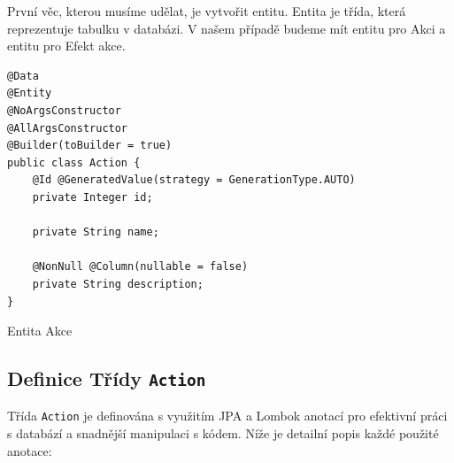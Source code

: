 První věc, kterou musíme udělat, je vytvořit entitu. Entita je třída, která reprezentuje tabulku v databázi. V našem případě budeme mít entitu pro Akci a entitu pro Efekt akce.

\begin{listing}[H]
    \begin{verbatim}
@Data
@Entity
@NoArgsConstructor
@AllArgsConstructor
@Builder(toBuilder = true)
public class Action {
    @Id @GeneratedValue(strategy = GenerationType.AUTO)
    private Integer id;

    private String name;

    @NonNull @Column(nullable = false)
    private String description;
}
    \end{verbatim}
    \caption{Entita Akce}
    \label{code:action-entity}
\end{listing}

\subsection*{Definice Třídy \texttt{Action}}

Třída \texttt{Action} je definována s využitím JPA a Lombok anotací pro efektivní práci s databází a snadnější manipulaci s kódem. Níže je detailní popis každé použité anotace:

